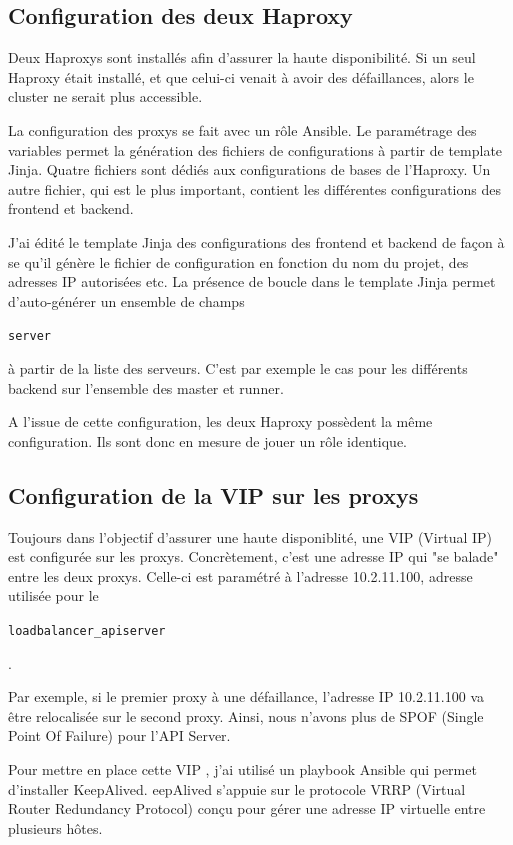 \documentclass[12pt, a4paper, twoside]{article}
\begin{document}
\newpage
\subsection{Configuration des deux Haproxy}
Deux Haproxys sont installés afin d'assurer la haute disponibilité.
Si un seul Haproxy était installé, et que celui-ci venait à avoir des défaillances, alors le cluster ne serait plus accessible.

La configuration des proxys se fait avec un rôle \gls{Ansible}.
Le paramétrage des variables permet la génération des fichiers de configurations à partir de template \gls{Jinja}.
Quatre fichiers sont dédiés aux configurations de bases de l'Haproxy.
Un autre fichier, qui est le plus important, contient les différentes configurations des frontend et backend.

J'ai édité le template Jinja des configurations des frontend et backend de façon à se qu'il génère le fichier de configuration en fonction du nom du projet, des adresses \gls{IP} autorisées etc.
La présence de boucle dans le template \gls{Jinja} permet d'auto-générer un ensemble de champs \begin{code}\texttt{server}\end{code} à partir de la liste des serveurs.
C'est par exemple le cas pour les différents backend sur l'ensemble des master et runner.

A l'issue de cette configuration, les deux Haproxy possèdent la même configuration.
Ils sont donc en mesure de jouer un rôle identique.
\subsection{Configuration de la VIP sur les proxys}
Toujours dans l'objectif d'assurer une haute disponiblité, une \gls{VIP}  (Virtual \gls{IP}) est configurée sur les proxys.
Concrètement, c'est une adresse \gls{IP} qui "se balade" entre les deux proxys.
Celle-ci est paramétré à l'adresse 10.2.11.100, adresse utilisée pour le \begin{code}\texttt{loadbalancer\_apiserver}\end{code}.

Par exemple, si le premier proxy à une défaillance, l'adresse \gls{IP} 10.2.11.100 va être relocalisée sur le second proxy.
Ainsi, nous n'avons plus de SPOF (Single Point Of Failure) pour l'\gls{API} Server.

Pour mettre en place cette \gls{VIP} , j'ai utilisé un playbook \gls{Ansible} qui permet d'installer KeepAlived.
eepAlived s'appuie sur le protocole VRRP (Virtual Router Redundancy Protocol) conçu pour gérer une adresse \gls{IP} virtuelle entre plusieurs hôtes.
\end{document}
